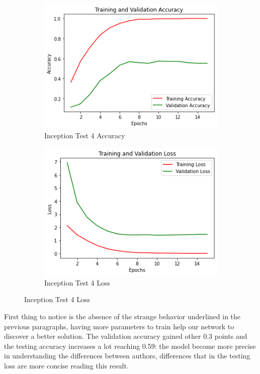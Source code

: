\begin{figure}[H]
	\begin{subfigure}{0.5\textwidth}
		\includegraphics[width=0.9\linewidth]{img/inception/inceptionft3acc.png} 
		\caption{Inception Test 4 Accuracy}
		\label{fig:inceptionft3acc}
	\end{subfigure}
	\begin{subfigure}{0.5\textwidth}
		\includegraphics[width=0.9\linewidth]{img/inception/inceptionft3loss.png}
		\caption{Inception Test 4 Loss}
		\label{fig:inceptionft3loss}
	\end{subfigure}
\end{figure}

First thing to notice is the absence of the strange behavior underlined in the previous paragraphs, having more parameters to train help our network to discover a better solution. The validation accuracy gained other 0.3 points and the testing accuracy increases a lot reaching 0.59: the model become more precise in understanding the differences between authors, differences that in the testing loss are more concise reading this result.

